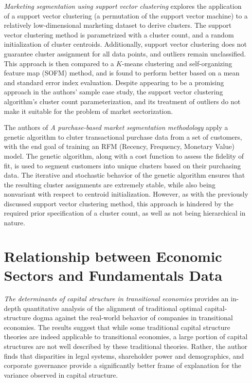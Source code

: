 \documentclass[../main.tex]{subfiles}
\begin{document}
\textit{Marketing segmentation using support vector clustering} explores the application of a support vector clustering (a permutation of the support vector machine) to a relatively low-dimensional marketing dataset to derive clusters. The support vector clustering method is parametrized with a cluster count, and a random initialization of cluster centroids. Additionally, support vector clustering does not guarantee cluster assignment for all data points, and outliers remain unclassified. This approach is then compared to a $K$-means clustering and self-organizing feature map (SOFM) method, and is found to perform better based on a mean and standard error index evaluation. Despite appearing to be a promising approach in the authors' sample case study, the support vector clustering algorithm's cluster count parameterization, and its treatment of outliers do not make it suitable for the problem of market sectorization.

The authors of \textit{A purchase-based market segmentation methodology} apply a genetic algorithm to cluter transactional purchase data from a set of customers, with the end goal of training an RFM (Recency, Frequency, Monetary Value) model. The genetic algorithm, along with a cost function to assess the fidelity of fit, is used to segment customers into unique clusters based on their purchasing data. The iterative and stochastic behavior of the genetic algorithm ensures that the resulting cluster assignments are extremely stable, while also being nonvariant with respect to centroid initialization. However, as with the previously discussed support vector clustering method, this approach is hindered by the required prior specification of a cluster count, as well as not being hierarchical in nature.

\pagebreak

\section{Relationship between Economic Sectors and Fundamentals Data} \label{literature_review:economic_sectors_fundamentals}

\textit{The determinants of capital structure in transitional economies} provides an in-depth quantitative analysis of the alignment of traditional optimal capital-structure dogma against the real-world behavior of companies in transitional economies. The results suggest that while some traditional capital structure theories are indeed applicable to transitional economies, a large portion of capital structures are not well described by these traditional theories. Rather, the author finds that disparities in legal systems, shareholder power and demographics, and corporate governance provide a significantly better frame of explanation for the variance observed in capital structure.
\end{document}
